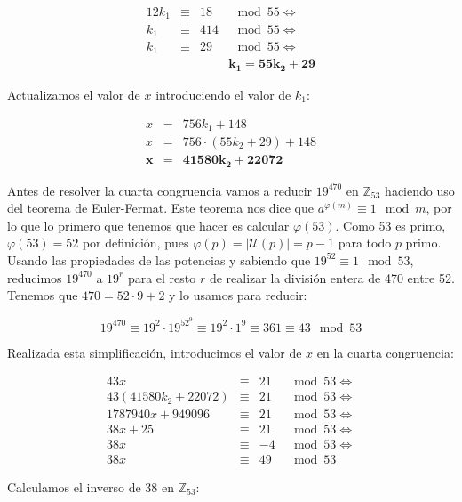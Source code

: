 \[
\begin{array}{rcrl}
	12k_1 & \equiv & 18  & \mod 55 \iff \\
	k_1   & \equiv & 414 & \mod 55 \iff \\
	k_1   & \equiv & 29  & \mod 55 \iff \\
         &        &     & \boldsymbol{k_1 = 55k_2 + 29}
\end{array}
\]

Actualizamos el valor de $x$ introduciendo el valor de $k_1$:

\[
\begin{array}{rcl}
	x              & =              & 756k_1 + 148                 \\
	x              & =              & 756 \cdot (55k_2 + 29) + 148 \\
	\boldsymbol{x} & \boldsymbol{=} & \boldsymbol{41580k_2 + 22072}
\end{array}
\]

Antes de resolver la cuarta congruencia vamos a reducir $19^{470}$ en $\mathbb{Z}_{53}$ haciendo uso del teorema de Euler-Fermat.
Este teorema nos dice que $a^{\varphi(m)} \equiv 1 \mod m$, por lo que lo primero que tenemos que hacer es calcular $\varphi(53)$.
Como 53 es primo, $\varphi(53) = 52$ por definición, pues $\varphi(p) = |\mathcal{U}(p)| = p-1$ para todo $p$ primo.
Usando las propiedades de las potencias y sabiendo que $19^{52} \equiv 1 \mod 53$, reducimos $19^{470}$ a $19^{r}$ para el resto $r$ de realizar la división entera de 470 entre 52.
Tenemos que $470 = 52 \cdot 9 + 2$ y lo usamos para reducir:

\[19^{470} \equiv 19^2 \cdot 19^{52^9} \equiv 19^2 \cdot 1^9 \equiv 361 \equiv 43 \mod 53\]

Realizada esta simplificación, introducimos el valor de $x$ en la cuarta congruencia:

\[
\begin{array}{rcrl}
	43x                  & \equiv & 21 & \mod 53 \iff \\
	43(41580k_2 + 22072) & \equiv & 21 & \mod 53 \iff \\
	1787940x + 949096    & \equiv & 21 & \mod 53 \iff \\
	38x + 25             & \equiv & 21 & \mod 53 \iff \\
	38x                  & \equiv & -4 & \mod 53 \iff \\
	38x                  & \equiv & 49 & \mod 53
\end{array}
\]

Calculamos el inverso de 38 en $\mathbb{Z}_{53}$:

